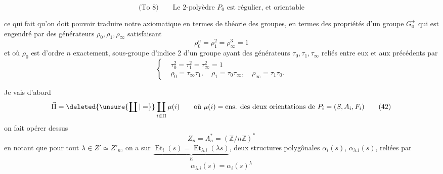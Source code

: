 
\[
 \text{(To 8)}\qquad\text{Le 2-polyèdre $P_0$ est régulier, et orientable}\tag*{(39)}
\]

ce qui fait qu'on doit pouvoir traduire notre axiomatique en termes de théorie des groupes,  en termes des propriétés d'un groupe $G_0^+$ qui est engendré par des générateurs $\rho_0,\rho_1,\rho_\infty$ satisfaisant
\[
 \boxed{\rho_0^n=\rho_1^2=\rho_\infty^3=1}\tag*{(40)}
\]
et où $\rho_0$ est d'ordre $n$ exactement, sous-groupe  d'indice 2 d'un groupe  ayant des générateurs $\tau_0,\tau_1,\tau_\infty$ reliés entre eux et aux précédents par
\[
 \left\{\begin{aligned}
 &\tau_0^2=\tau_1^2=\tau_\infty^2=1\\
 &\rho_0=\tau_\infty\tau_1,\quad \rho_1=\tau_0\tau_\infty,\quad
 \rho_\infty=\tau_1\tau_0 .
 \end{aligned}\right. \tag*{(41)}
\]

Je vais d'abord  
\[
 \vec\Pi=\deleted{\unsure{\coprod|=}}\coprod_{i\in\Pi}\mu(i)\qquad
 \text{où }\mu(i)=\text{ens. des deux orientations de }P_i=(S,A_i,F_i)\tag*{(42)}
\]
on fait opérer dessus 
\[
 Z_n=\Lambda_n^{*}=(\mathbb Z/n\mathbb Z)^*\tag*{(43)}
\]
en notant que pour tout   $\lambda\in Z'\simeq Z'_n$,  on a sur $\underbrace{\operatorname{Et}_i(s)=\operatorname{Et}_{\lambda.i}(\lambda s)}_{E}$, deux structures polygônales  $\alpha_i(s)$, $\alpha_{\lambda.i}(s)$, reliées par
\[
 \alpha_{\lambda.i}(s)=\alpha_i(s)^\lambda\tag*{(44)}
\]


